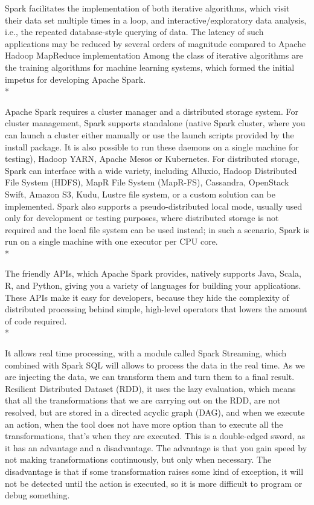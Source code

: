 Spark facilitates the implementation of both iterative algorithms, which visit their data set multiple times in a loop, and interactive/exploratory data analysis, i.e., the repeated database-style querying of data. The latency of such applications may be reduced by several orders of magnitude compared to Apache Hadoop MapReduce implementation Among the class of iterative algorithms are the training algorithms for machine learning systems, which formed the initial impetus for developing Apache Spark. \\*

Apache Spark requires a cluster manager and a distributed storage system. For cluster management, Spark supports standalone (native Spark cluster, where you can launch a cluster either manually or use the launch scripts provided by the install package. It is also possible to run these daemons on a single machine for testing), Hadoop YARN, Apache Mesos or Kubernetes. For distributed storage, Spark can interface with a wide variety, including Alluxio, Hadoop Distributed File System (HDFS), MapR File System (MapR-FS), Cassandra, OpenStack Swift, Amazon S3, Kudu, Lustre file system, or a custom solution can be implemented. Spark also supports a pseudo-distributed local mode, usually used only for development or testing purposes, where distributed storage is not required and the local file system can be used instead; in such a scenario, Spark is run on a single machine with one executor per CPU core.\cite{wang2014characterization} \\*

The friendly APIs, which Apache Spark provides, natively supports Java, Scala, R, and Python, giving you a variety of languages for building your applications. These APIs make it easy for developers, because they hide the complexity of distributed processing behind simple, high-level operators that lowers the amount of code required.\\*

It allows real time processing, with a module called Spark Streaming, which combined with Spark SQL will allows to process the data in the real time. As we are injecting the data, we can transform them and turn them to a final result.
Resilient Distributed Dataset (RDD), it uses the lazy evaluation, which means that all the transformations that we are carrying out on the RDD, are not resolved, but are stored in a directed acyclic graph (DAG), and when we execute an action, when the tool does not have more option than to execute all the transformations, that's when they are executed. This is a double-edged sword, as it has an advantage and a disadvantage. The advantage is that you gain speed by not making transformations continuously, but only when necessary. The disadvantage is that if some transformation raises some kind of exception, it will not be detected until the action is executed, so it is more difficult to program or debug something.

